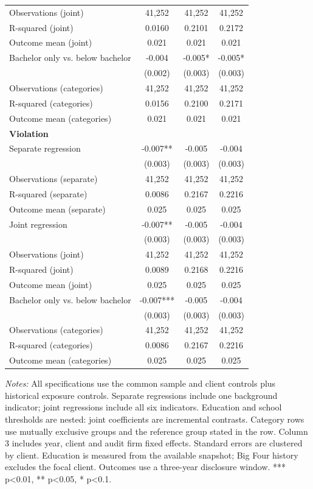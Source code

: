 \documentclass[10pt]{article}
\begin{document}
\begin{minipage}{19cm}
\begin{threeparttable}
\begin{tabular}{p{}ccc}
Observations (joint) & 41,252 & 41,252 & 41,252 \\
R-squared (joint) & 0.0160 & 0.2101 & 0.2172 \\
Outcome mean (joint) & 0.021 & 0.021 & 0.021 \\
Bachelor only vs. below bachelor & -0.004 & -0.005* & -0.005* \\
 & (0.002) & (0.003) & (0.003) \\
Observations (categories) & 41,252 & 41,252 & 41,252 \\
R-squared (categories) & 0.0156 & 0.2100 & 0.2171 \\
Outcome mean (categories) & 0.021 & 0.021 & 0.021 \\
\multicolumn{4}{l}{\textbf{Violation}} \\
Separate regression & -0.007** & -0.005 & -0.004 \\
 & (0.003) & (0.003) & (0.003) \\
Observations (separate) & 41,252 & 41,252 & 41,252 \\
R-squared (separate) & 0.0086 & 0.2167 & 0.2216 \\
Outcome mean (separate) & 0.025 & 0.025 & 0.025 \\
Joint regression & -0.007** & -0.005 & -0.004 \\
 & (0.003) & (0.003) & (0.003) \\
Observations (joint) & 41,252 & 41,252 & 41,252 \\
R-squared (joint) & 0.0089 & 0.2168 & 0.2216 \\
Outcome mean (joint) & 0.025 & 0.025 & 0.025 \\
Bachelor only vs. below bachelor & -0.007*** & -0.005 & -0.004 \\
 & (0.003) & (0.003) & (0.003) \\
Observations (categories) & 41,252 & 41,252 & 41,252 \\
R-squared (categories) & 0.0086 & 0.2167 & 0.2216 \\
Outcome mean (categories) & 0.025 & 0.025 & 0.025 \\
\bottomrule
\end{tabular}
\begin{tablenotes}\fontsize{9}{11}\selectfont
\item \raggedright \fontsize{9}{11}\selectfont \textit{Notes:} All specifications use the common sample and client controls plus historical exposure controls. Separate regressions include one background indicator; joint regressions include all six indicators. Education and school thresholds are nested: joint coefficients are incremental contrasts. Category rows use mutually exclusive groups and the reference group stated in the row. Column 3 includes year, client and audit firm fixed effects. Standard errors are clustered by client. Education is measured from the available snapshot; Big Four history excludes the focal client. Outcomes use a three-year disclosure window. *** p<0.01, ** p<0.05, * p<0.1.
\end{tablenotes}
\end{threeparttable}

\end{minipage}
\end{document}
